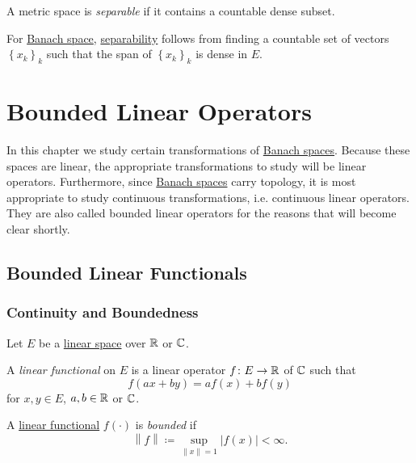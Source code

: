 \begin{definition}[Separable]\label{def:separable}
	A metric space is \emph{separable} if it contains a countable dense subset.
\end{definition}

\begin{remark}
	For \hyperref[def:Banach-space]{Banach space}, \hyperref[def:separable]{separability} follows from finding a countable set of vectors \(\left\{ x_{k}\right\}_k\) such that the span of \(\left\{ x_{k}\right\}_k\) is dense in \(E\).
\end{remark}

\chapter{Bounded Linear Operators}

In this chapter we study certain transformations of \hyperref[def:Banach-space]{Banach spaces}. Because these spaces are linear, the appropriate transformations to study will be linear operators. Furthermore, since \hyperref[def:Banach-space]{Banach spaces} carry topology, it is most appropriate to study continuous transformations, i.e. continuous linear operators. They are also called bounded linear operators for the reasons that will become clear shortly.

\section{Bounded Linear Functionals}
\subsection{Continuity and Boundedness}
\begin{definition*}
	Let \(E\) be a \hyperref[def:linear-vector-space]{linear space} over \(\mathbb{\MakeUppercase{r}} \) or \(\mathbb{\MakeUppercase{c}} \).
	\begin{definition}\label{def:linear-functional}
		A \emph{linear functional} on \(E\) is a linear operator \(f\colon E\to \mathbb{\MakeUppercase{r}} \) of \(\mathbb{\MakeUppercase{c}} \) such that
		\[
			f(ax + by) = af(x) + bf(y)
		\]
		for \(x, y\in E\), \(a, b\in \mathbb{\MakeUppercase{r}} \) or \(\mathbb{\MakeUppercase{c}} \).
	\end{definition}
	\begin{definition}\label{def:bounded-linear-functional}
		A \hyperref[def:linear-functional]{linear functional} \(f(\cdot)\) is \emph{bounded} if
		\[
			\left\lVert f\right\rVert \coloneqq \sup _{\left\lVert x\right\rVert = 1}\left\vert f(x) \right\vert  < \infty.
		\]
	\end{definition}
\end{definition*}

